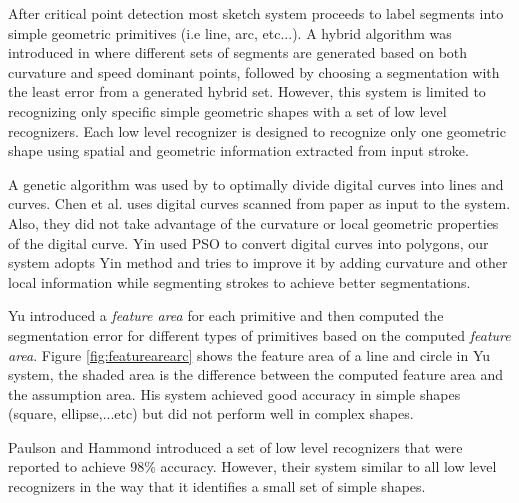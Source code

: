
 After critical point detection most sketch system proceeds to label segments into simple geometric primitives (i.e line, arc, etc...).  A hybrid algorithm was introduced in \cite{earlyprocess} where different sets of segments are generated based on both curvature and speed dominant points, followed by choosing a segmentation with the least error from a generated hybrid set. However, this system is limited to recognizing only specific simple geometric shapes with a set of low level recognizers. Each low level recognizer is designed to recognize only one geometric shape using spatial and geometric information extracted from input stroke.  
 
  A genetic algorithm was used by \cite{CruveDivisionSwarm} to optimally divide digital curves into lines and curves. Chen et al. \cite{CruveDivisionSwarm} uses digital curves scanned from paper as input to the system. Also, they did not take advantage of the curvature or local geometric properties of the digital curve. Yin \cite{PolygonApproximationPSO} used PSO to convert digital curves into polygons, our system adopts  Yin \cite{PolygonApproximationPSO} method and tries to improve it by adding curvature and other local information while segmenting strokes to achieve better segmentations. %
 
 
Yu \cite{meanshift10} introduced a \textit{feature area} for each primitive and then computed the segmentation error for different types of primitives based on the computed \textit{feature area}. Figure \ref{fig:featurearearc} shows the feature area of a line and circle in Yu system, the shaded area is the difference between the computed feature area and the assumption area. His system achieved good accuracy in simple shapes (square, ellipse,...etc) but did not perform well in complex shapes. 
 
 Paulson and Hammond \cite{Paleosketch08} introduced a set of low level recognizers that were reported to achieve 98\% accuracy. However, their system similar to all low level recognizers in the way that it identifies a small set of simple shapes.%
 
